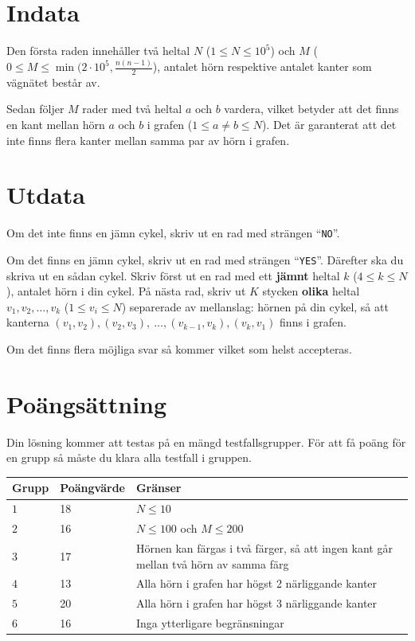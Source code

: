 \section*{Indata}

Den första raden innehåller två heltal $N$ ($1 \le N \le 10^5$) och $M$ ($0 \le M \le \min(2 \cdot 10^5, \frac{n(n-1)}{2}$), antalet hörn respektive antalet kanter som vägnätet består av.

  Sedan följer $M$ rader med två heltal $a$ och $b$ vardera, vilket betyder att det finns en kant mellan hörn $a$ och $b$ i grafen ($1\le a \neq b \le N$). Det är garanterat att det inte finns flera kanter mellan samma par av hörn i grafen.

\section*{Utdata}
Om det inte finns en jämn cykel, skriv ut en rad med strängen ``\texttt{NO}''.

Om det finns en jämn cykel, skriv ut en rad med strängen ``\texttt{YES}''. Därefter ska du skriva ut en sådan cykel. Skriv först ut en rad med ett \textbf{jämnt} heltal $k$ ($4\le k \le N$), antalet hörn i din cykel. På nästa rad, skriv ut $K$ stycken \textbf{olika} heltal $v_{1}, v_{2}, \ldots, v_{k}$ ($1\le v_{i}\le N$) separerade av mellanslag: hörnen på din cykel, så att kanterna $(v_{1},v_{2}), (v_{2},v_{3}),\ \ldots, (v_{k-1},v_{k}), (v_{k}, v_{1})$ finns i grafen.

Om det finns flera möjliga svar så kommer vilket som helst accepteras.

\section*{Poängsättning}
Din lösning kommer att testas på en mängd testfallsgrupper.
För att få poäng för en grupp så måste du klara alla testfall i gruppen.

\noindent
\begin{tabular}{| l | l | l |}
  \hline
  Grupp & Poängvärde & Gränser \\ \hline
  $1$ & 18 & $N\le 10$
  \\ \hline
  $2$ & 16 & $N\le 100$ och $M\le 200$
  \\ \hline
  $3$  & 17 & Hörnen kan färgas i två färger, så att ingen kant går mellan två hörn av samma färg
  \\ \hline
  $4$  & 13 & Alla hörn i grafen har högst 2 närliggande kanter
  \\ \hline
  $5$  & 20 & Alla hörn i grafen har högst 3 närliggande kanter
  \\ \hline
  $6$  & 16 & Inga ytterligare begränsningar
  \\ \hline
\end{tabular}
